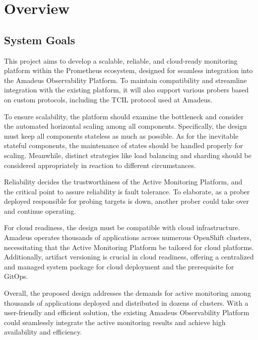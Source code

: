 
\chapter{Overview}\label{chapter:overview}

\section{System Goals}

This project aims to develop a scalable, reliable, and cloud-ready monitoring platform within the Prometheus ecosystem, designed for seamless integration into the Amadeus Observability Platform. To maintain compatibility and streamline integration with the existing platform, it will also support various probers based on custom protocols, including the \ac{TCIL} protocol used at Amadeus. 

To ensure scalability, the platform should examine the bottleneck and consider the automated horizontal scaling among all components. Specifically, the design must keep all components stateless as much as possible. As for the inevitable stateful components, the maintenance of states should be handled properly for scaling. Meanwhile, distinct strategies like load balancing and sharding should be considered appropriately in reaction to different circumstances. 

Reliability decides the trustworthiness of the Active Monitoring Platform, and the critical point to assure reliability is fault tolerance. To elaborate, as a prober deployed responsible for probing targets is down, another prober could take over and continue operating. 

For cloud readiness, the design must be compatible with cloud infrastructure. Amadeus operates thousands of applications across numerous OpenShift clusters, necessitating that the Active Monitoring Platform be tailored for cloud platforms. Additionally, artifact versioning is crucial in cloud readiness, offering a centralized and managed system package for cloud deployment and the prerequisite for GitOps. 

Overall, the proposed design addresses the demands for active monitoring among thousands of applications deployed and distributed in dozens of clusters. With a user-friendly and efficient solution, the existing Amadeus Observability Platform could seamlessly integrate the active monitoring results and achieve high availability and efficiency. 

